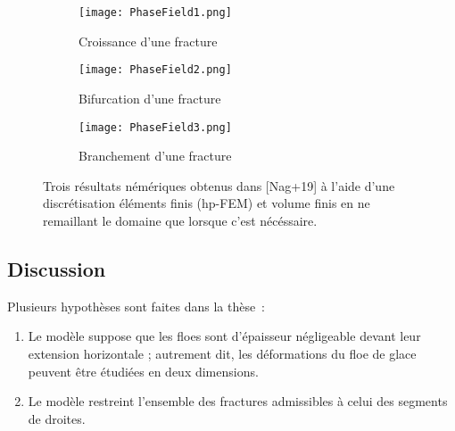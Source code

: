 \begin{figure}[!ht]
    \centering
    \begin{subfigure}[b]{0.9\textwidth}
        \centering
        \texttt{[image: PhaseField1.png]} 
        \caption{Croissance d’une fracture}
        \label{fig:PhaseField1}
    \end{subfigure}
    \begin{subfigure}[b]{0.9\textwidth}
        \centering
        \texttt{[image: PhaseField2.png]} 
        \caption{Bifurcation d’une fracture}
        \label{fig:PhaseField2}
    \end{subfigure}
    \begin{subfigure}[b]{0.9\textwidth}
        \centering
        \texttt{[image: PhaseField3.png]} 
        \caption{Branchement d’une fracture}
        \label{fig:PhaseField3}
    \end{subfigure}
       \caption{Trois résultats némériques obtenus dans [Nag+19] à l'aide d'une discrétisation éléments finis (hp-FEM) et volume finis en ne remaillant le domaine que lorsque c'est nécéssaire.}
       \label{fig:PhaseField}
\end{figure}




 













\subsection{Discussion}

Plusieurs hypothèses sont faites dans la thèse :
\begin{enumerate}
    \item Le modèle suppose que les floes sont d’épaisseur négligeable devant leur extension horizontale ; autrement dit, les déformations du floe de glace peuvent être étudiées en deux dimensions.
    \item Le modèle restreint l’ensemble des fractures admissibles à celui des segments de droites.
\end{enumerate}